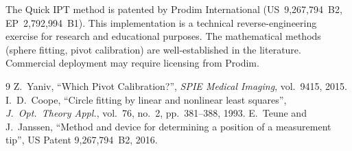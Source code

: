 \documentclass[11pt,a4paper]{article}
\begin{document}
The Quick IPT method is patented by Prodim International
(US~9{,}267{,}794~B2, EP~2{,}792{,}994~B1).  This implementation is a technical
reverse-engineering exercise for research and educational purposes.  The
mathematical methods (sphere fitting, pivot calibration) are well-established
in the literature.  Commercial deployment may require licensing from Prodim.

\begin{thebibliography}{9}
  Z.~Yaniv,
  ``Which Pivot Calibration?'',
  \emph{SPIE Medical Imaging}, vol.~9415, 2015.
  I.~D.~Coope,
  ``Circle fitting by linear and nonlinear least squares'',
  \emph{J.~Opt.\ Theory Appl.}, vol.~76, no.~2, pp.~381--388, 1993.
  E.~Teune and J.~Janssen,
  ``Method and device for determining a position of a measurement tip'',
  US Patent 9{,}267{,}794~B2, 2016.
\end{thebibliography}
\end{document}
